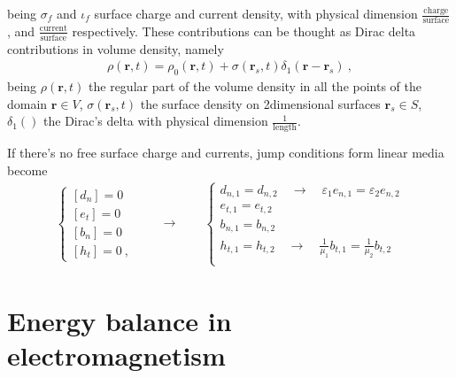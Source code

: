 \documentclass[letterpaper,10pt,italian]{jupyterBook}
\begin{document}
\sphinxAtStartPar
being \(\sigma_f\) and \(\iota_f\) surface charge and current density, with physical dimension \(\frac{\text{charge}}{\text{surface}}\), and \(\frac{\text{current}}{\text{surface}}\) respectively. These contributions can be thought as Dirac delta contributions in volume density, namely
\begin{equation*}
\begin{split}\rho(\mathbf{r},t) = \rho_0(\mathbf{r},t) + \sigma(\mathbf{r}_s,t) \delta_{1}(\mathbf{r}-\mathbf{r}_s) \ ,\end{split}
\end{equation*}
\sphinxAtStartPar
being \(\rho(\mathbf{r},t)\) the regular part of the volume density in all the points of the domain \(\mathbf{r} \in V\), \(\sigma(\mathbf{r}_s,t)\) the surface density on 2\sphinxhyphen{}dimensional surfaces \(\mathbf{r}_s \in S\), \(\delta_1()\) the Dirac’s delta with physical dimension \(\frac{1}{\text{length}}\).

\sphinxAtStartPar
If there’s no free surface charge and currents, jump conditions form linear media become
\begin{equation}\label{equation:ch/media:eq:em-jump:no-surf-density}
\begin{split}\begin{cases}
  [ d_n ] = 0 \\
  [ e_t ] = 0 \\
  [ b_n ] = 0 \\
  [ h_t ] = 0 \ ,
\end{cases}
\qquad \rightarrow \qquad
\begin{cases}
  d_{n,1} = d_{n,2}  \quad \rightarrow \quad \varepsilon_1 e_{n,1} = \varepsilon_2 e_{n,2} \\
  e_{t,1} = e_{t,2}  \\
  b_{n,1} = b_{n,2}  \\
  h_{t,1} = h_{t,2}  \quad \rightarrow \quad \frac{1}{\mu_1} b_{t,1} = \frac{1}{\mu_2} b_{t,2} \\
\end{cases}
\end{split}
\end{equation}
\sphinxstepscope




\chapter{Energy balance in electromagnetism}
\label{\detokenize{ch/energy:energy-balance-in-electromagnetism}}\label{\detokenize{ch/energy:classical-electromagnetism-energy}}\label{\detokenize{ch/energy::doc}}
\end{document}
